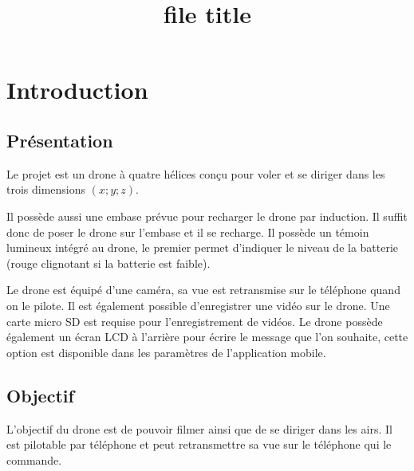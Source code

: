 \documentclass{rapport}
\title{file title} %
\begin{document}

\subject{Drone \textit{\name}} %



        
\buildmargins %
\buildcover %
\toc %


\section{Introduction}
\subsection{Présentation}
Le projet \textit{\name} est un drone à quatre hélices conçu pour voler et se diriger dans les trois dimensions $(x; y; z)$.

Il possède aussi une embase prévue pour recharger le drone par induction. Il suffit donc de poser le drone sur l'embase et il se recharge. Il possède un témoin lumineux intégré au drone, le premier permet d'indiquer le niveau de la batterie (rouge clignotant si la batterie est faible).

Le drone est équipé d'une caméra, sa vue est retransmise sur le téléphone quand on le pilote. Il est également possible d'enregistrer une vidéo sur le drone. Une carte micro SD est requise pour l'enregistrement de vidéos. Le drone possède également un écran LCD à l'arrière pour écrire le message que l'on souhaite, cette option est disponible dans les paramètres de l'application mobile.

\subsection{Objectif}
L'objectif du drone \textit{\name} est de pouvoir filmer ainsi que de se diriger dans les airs. Il est pilotable par téléphone et peut retransmettre sa vue sur le téléphone qui le commande.
\end{document}
